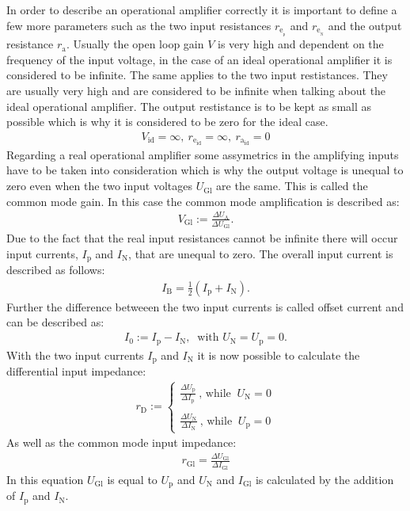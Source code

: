 \FloatBarrier

\noindent In order to describe an operational amplifier correctly it is important to define
a few more parameters such as the two input resistances $r_{\text{e}_{{}_\text{p}}}$
and $r_{\text{e}_{{}_\text{N}}}$ and the output resistance $r_{\text{a}}$.
Usually the open loop gain $V$ is very high and dependent on the frequency of the
input voltage, in the case of an ideal operational amplifier it is considered to
be infinite. The same applies to the two input restistances. They are usually very
high and are considered to be infinite when talking about the ideal operational
amplifier. The output restistance is to be kept as small as possible which is why
it is considered to be zero for the ideal case.
\begin{align*}
    V_{\text{id}}=\infty,~ r_{\text{e}_{\text{id}}}=\infty,~ r_{\text{a}_{\text{id}}}=0
\end{align*}
Regarding a real operational amplifier some assymetrics in the amplifying inputs
have to be taken into consideration which is why the output voltage is unequal to
zero even when the two input voltages $U_{\text{Gl}}$ are the same. This is
called the common mode gain. In this case the common mode amplification is described
as:
\begin{align*}
    V_{\text{Gl}}:=\frac{\Delta U_{\text{A}}}{\Delta U_{\text{Gl}}}.
\end{align*}
Due to the fact that the real input resistances cannot be infinite there will occur
input currents, $I_{\text{p}}$ and $I_{\text{N}}$, that are unequal to zero.
The overall input current is described as follows:
\begin{align*}
    I_{\text{B}} = \frac{1}{2} \left( I_{\text{p}} + I_{\text{N}} \right).
\end{align*}
Further the difference betweeen the two input currents is called offset current
and can be described as:
\begin{align*}
    I_0:=I_{\text{p}} - I_{\text{N}} ,~ \text{ with } U_{\text{N}} = U_{\text{p}} = 0 .
\end{align*}
With the two input currents $I_{\text{p}}$ and $I_{\text{N}}$ it is now possible
to calculate the differential input impedance:
\begin{align*}
    r_\text{D}:=
	\begin{cases}
		\frac{\Delta U_{\text{p}}}{\Delta I_{\text{p}}} ~ \text{, while }~ U_{\text{N}} = 0   \\
		\\
		\frac{\Delta U_{\text{N}}}{\Delta I_{\text{N}}} ~ \text{, while }~ U_\text{p}=0
\end{cases}
\end{align*}
As well as the common mode input impedance:
\begin{align*}
    r_{\text{Gl}} = \frac{\Delta U_{\text{Gl}}}{\Delta I_{\text{Gl}}}
\end{align*}
In this equation $U_{\text{Gl}}$ is equal to $U_{\text{p}}$ and $U_{\text{N}}$ and
$I_{\text{Gl}}$ is calculated by the addition of $I_{\text{p}}$ and $I_{\text{N}}$.

